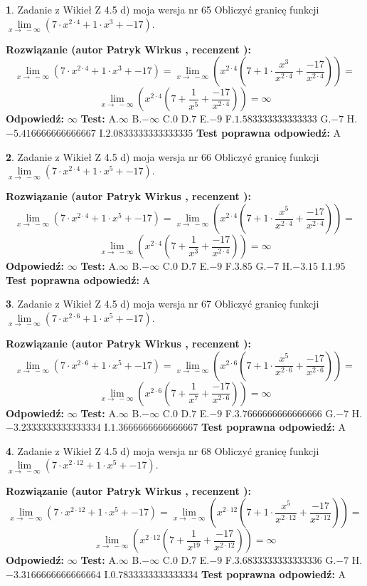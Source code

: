 \documentclass[12pt, a4paper]{article}
\theoremstyle{definition} %
\newtheorem{zad}{}
\newcommand{\zadStart}[1]{\begin{zad}#1\newline}
\newcommand{\zadStop}{\end{zad}}
\newcommand{\rozwStart}[2]{\noindent \textbf{Rozwiązanie (autor #1 , recenzent #2): }\newline}
\newcommand{\rozwStop}{\newline}
\newcommand{\odpStart}{\noindent \textbf{Odpowiedź:}\newline}
\newcommand{\odpStop}{\newline}
\newcommand{\testStart}{\noindent \textbf{Test:}\newline}
\newcommand{\testStop}{\newline}
\newcommand{\kluczStart}{\noindent \textbf{Test poprawna odpowiedź:}\newline}
\newcommand{\kluczStop}{\newline}
\begin{document}
\zadStart{Zadanie z Wikieł Z 4.5 d) moja wersja nr 65}
Obliczyć granicę funkcji  $\lim\limits_{x\to\ -\infty}(7 \cdot x^{2\cdot4}+1 \cdot x^{3}+-17)$.
\zadStop
\rozwStart{Patryk Wirkus}{}
$$\lim\limits_{x\to\ -\infty}(7 \cdot x^{2\cdot4}+1 \cdot x^{3}+-17) = \lim\limits_{x\to\ -\infty}(x^{2\cdot4}(7 +1 \cdot \frac{x^{3}}{x^{2\cdot4}}+\frac{-17}{x^{2\cdot4}})) =$$ $$\lim\limits_{x\to\ -\infty}(x^{2\cdot4}(7 +\frac{1}{x^{5}}+\frac{-17}{x^{2\cdot4}})) =\infty$$
\rozwStop
\odpStart
$\infty$
\odpStop
\testStart
A.$\infty$ B.$-\infty$ C.$0$ D.$7$ E.$-9$
F.$1.583333333333333$ G.$-7$
H.$-5.416666666666667$
I.$2.0833333333333335$
\testStop
\kluczStart
A
\kluczStop



\zadStart{Zadanie z Wikieł Z 4.5 d) moja wersja nr 66}
Obliczyć granicę funkcji  $\lim\limits_{x\to\ -\infty}(7 \cdot x^{2\cdot4}+1 \cdot x^{5}+-17)$.
\zadStop
\rozwStart{Patryk Wirkus}{}
$$\lim\limits_{x\to\ -\infty}(7 \cdot x^{2\cdot4}+1 \cdot x^{5}+-17) = \lim\limits_{x\to\ -\infty}(x^{2\cdot4}(7 +1 \cdot \frac{x^{5}}{x^{2\cdot4}}+\frac{-17}{x^{2\cdot4}})) =$$ $$\lim\limits_{x\to\ -\infty}(x^{2\cdot4}(7 +\frac{1}{x^{3}}+\frac{-17}{x^{2\cdot4}})) =\infty$$
\rozwStop
\odpStart
$\infty$
\odpStop
\testStart
A.$\infty$ B.$-\infty$ C.$0$ D.$7$ E.$-9$
F.$3.85$ G.$-7$
H.$-3.15$
I.$1.95$
\testStop
\kluczStart
A
\kluczStop



\zadStart{Zadanie z Wikieł Z 4.5 d) moja wersja nr 67}
Obliczyć granicę funkcji  $\lim\limits_{x\to\ -\infty}(7 \cdot x^{2\cdot6}+1 \cdot x^{5}+-17)$.
\zadStop
\rozwStart{Patryk Wirkus}{}
$$\lim\limits_{x\to\ -\infty}(7 \cdot x^{2\cdot6}+1 \cdot x^{5}+-17) = \lim\limits_{x\to\ -\infty}(x^{2\cdot6}(7 +1 \cdot \frac{x^{5}}{x^{2\cdot6}}+\frac{-17}{x^{2\cdot6}})) =$$ $$\lim\limits_{x\to\ -\infty}(x^{2\cdot6}(7 +\frac{1}{x^{7}}+\frac{-17}{x^{2\cdot6}})) =\infty$$
\rozwStop
\odpStart
$\infty$
\odpStop
\testStart
A.$\infty$ B.$-\infty$ C.$0$ D.$7$ E.$-9$
F.$3.7666666666666666$ G.$-7$
H.$-3.2333333333333334$
I.$1.3666666666666667$
\testStop
\kluczStart
A
\kluczStop



\zadStart{Zadanie z Wikieł Z 4.5 d) moja wersja nr 68}
Obliczyć granicę funkcji  $\lim\limits_{x\to\ -\infty}(7 \cdot x^{2\cdot12}+1 \cdot x^{5}+-17)$.
\zadStop
\rozwStart{Patryk Wirkus}{}
$$\lim\limits_{x\to\ -\infty}(7 \cdot x^{2\cdot12}+1 \cdot x^{5}+-17) = \lim\limits_{x\to\ -\infty}(x^{2\cdot12}(7 +1 \cdot \frac{x^{5}}{x^{2\cdot12}}+\frac{-17}{x^{2\cdot12}})) =$$ $$\lim\limits_{x\to\ -\infty}(x^{2\cdot12}(7 +\frac{1}{x^{19}}+\frac{-17}{x^{2\cdot12}})) =\infty$$
\rozwStop
\odpStart
$\infty$
\odpStop
\testStart
A.$\infty$ B.$-\infty$ C.$0$ D.$7$ E.$-9$
F.$3.6833333333333336$ G.$-7$
H.$-3.3166666666666664$
I.$0.7833333333333334$
\testStop
\kluczStart
A
\kluczStop
\end{document}
